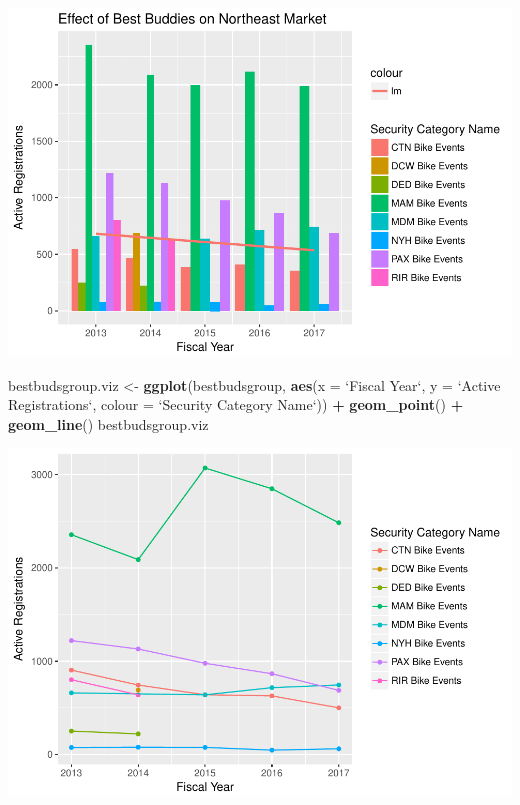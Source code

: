 \documentclass[]{article}
\newenvironment{Shaded}{\begin{snugshade}}{\end{snugshade}}
\newcommand{\KeywordTok}[1]{\textcolor[rgb]{0.13,0.29,0.53}{\textbf{#1}}}
\newcommand{\DataTypeTok}[1]{\textcolor[rgb]{0.13,0.29,0.53}{#1}}
\newcommand{\StringTok}[1]{\textcolor[rgb]{0.31,0.60,0.02}{#1}}
\newcommand{\OperatorTok}[1]{\textcolor[rgb]{0.81,0.36,0.00}{\textbf{#1}}}
\newcommand{\NormalTok}[1]{#1}
\begin{document}
\includegraphics{index_files/figure-latex/bestbuddies-1.pdf}

\begin{Shaded}
\begin{Highlighting}[]
\NormalTok{bestbudsgroup.viz <-}\StringTok{ }\KeywordTok{ggplot}\NormalTok{(bestbudsgroup, }\KeywordTok{aes}\NormalTok{(}\DataTypeTok{x =} \StringTok{`}\DataTypeTok{Fiscal Year}\StringTok{`}\NormalTok{, }
    \DataTypeTok{y =} \StringTok{`}\DataTypeTok{Active Registrations}\StringTok{`}\NormalTok{, }\DataTypeTok{colour =} \StringTok{`}\DataTypeTok{Security Category Name}\StringTok{`}\NormalTok{)) }\OperatorTok{+}\StringTok{ }
\StringTok{    }\KeywordTok{geom_point}\NormalTok{() }\OperatorTok{+}\StringTok{ }\KeywordTok{geom_line}\NormalTok{()}
\NormalTok{bestbudsgroup.viz}
\end{Highlighting}
\end{Shaded}

\includegraphics{index_files/figure-latex/bestbuddies-2.pdf}
\end{document}
